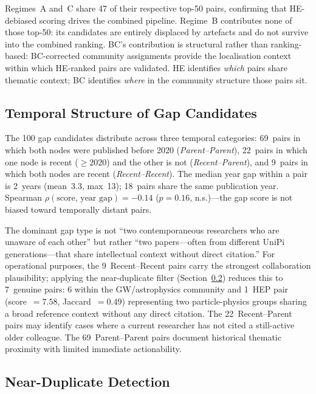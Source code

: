 Regimes~A and~C share 47 of their respective top-50 pairs, confirming that HE-debiased scoring drives the combined pipeline. Regime~B contributes none of those top-50: its candidates are entirely displaced by artefacts and do not survive into the combined ranking.  BC's contribution is structural rather than ranking-based: BC-corrected community assignments provide the localisation context within which HE-ranked pairs are validated.  HE identifies \emph{which} pairs share thematic context; BC identifies \emph{where} in the community structure those pairs sit.

\subsection{Temporal Structure of Gap Candidates}
\label{subsec:q:temporal}

The 100 gap candidates distribute across three temporal categories:
69~pairs in which both nodes were published before 2020
(\emph{Parent--Parent}), 22~pairs in which one node is recent
($\geq 2020$) and the other is not (\emph{Recent--Parent}), and
9~pairs in which both nodes are recent (\emph{Recent--Recent}).
The median year gap within a pair is 2~years (mean~3.3, max~13);
18~pairs share the same publication year.  Spearman
$\rho(\text{score},\,\text{year gap}) = -0.14$ ($p = 0.16$,
n.s.)---the gap score is not biased toward temporally distant pairs.

The dominant gap type is not ``two contemporaneous researchers who are
unaware of each other'' but rather ``two papers---often from different
UniPi generations---that share intellectual context without direct
citation.''  For operational purposes, the 9~Recent--Recent pairs
carry the strongest collaboration plausibility; applying the
near-duplicate filter (Section~\ref{subsec:q:neardup}) reduces this
to 7~genuine pairs: 6 within the GW/astrophysics community and
1~HEP pair (score~$= 7.58$, Jaccard~$= 0.49$) representing two
particle-physics groups sharing a broad reference context without
any direct citation.  The 22~Recent--Parent pairs may identify cases
where a current researcher has not cited a still-active older
colleague.  The 69~Parent--Parent pairs document historical thematic
proximity with limited immediate actionability.


\subsection{Near-Duplicate Detection}
\label{subsec:q:neardup}

